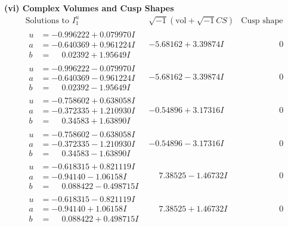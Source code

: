 \documentclass[1p]{elsarticle_modified}
\theoremstyle{definition}
\newcommand{\I}{\sqrt{-1}}
\begin{document}
\newpage\flushleft \textbf{(vi) Complex Volumes and Cusp Shapes}
$$\begin{array}{c|c|c}  
\text{Solutions to }I^u_{1}& \I (\text{vol} + \sqrt{-1}CS) & \text{Cusp shape}\\
 \hline 
\begin{aligned}
u &= -0.996222 + 0.079970 I \\
a &= -0.640369 + 0.961224 I \\
b &= \phantom{-}0.02392 + 1.95649 I\end{aligned}
 & -5.68162 + 3.39874 I & \phantom{-0.000000 } 0 \\ \hline\begin{aligned}
u &= -0.996222 - 0.079970 I \\
a &= -0.640369 - 0.961224 I \\
b &= \phantom{-}0.02392 - 1.95649 I\end{aligned}
 & -5.68162 - 3.39874 I & \phantom{-0.000000 } 0 \\ \hline\begin{aligned}
u &= -0.758602 + 0.638058 I \\
a &= -0.372335 + 1.210930 I \\
b &= \phantom{-}0.34583 + 1.63890 I\end{aligned}
 & -0.54896 + 3.17316 I & \phantom{-0.000000 } 0 \\ \hline\begin{aligned}
u &= -0.758602 - 0.638058 I \\
a &= -0.372335 - 1.210930 I \\
b &= \phantom{-}0.34583 - 1.63890 I\end{aligned}
 & -0.54896 - 3.17316 I & \phantom{-0.000000 } 0 \\ \hline\begin{aligned}
u &= -0.618315 + 0.821119 I \\
a &= -0.94140 - 1.06158 I \\
b &= \phantom{-}0.088422 - 0.498715 I\end{aligned}
 & \phantom{-}7.38525 - 1.46732 I & \phantom{-0.000000 } 0 \\ \hline\begin{aligned}
u &= -0.618315 - 0.821119 I \\
a &= -0.94140 + 1.06158 I \\
b &= \phantom{-}0.088422 + 0.498715 I\end{aligned}
 & \phantom{-}7.38525 + 1.46732 I & \phantom{-0.000000 } 0 \\ \hline\begin{aligned}

\end{aligned}
\end{array}$$
\end{document}
